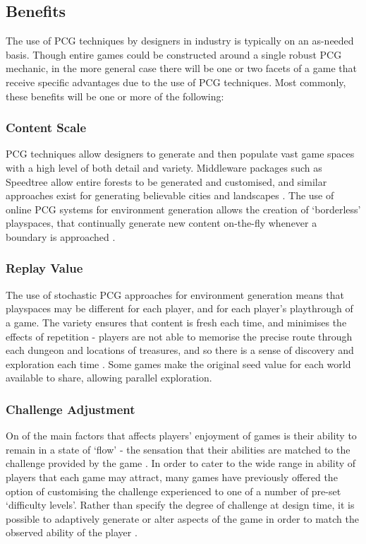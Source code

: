 \documentclass{acm_proc_article-sp}
\begin{document}
\newpage
\subsection{Benefits}
The use of PCG techniques by designers in industry is typically on an as-needed basis. Though entire games could be constructed around a single robust PCG mechanic, in the more general case there will be one or two facets of a game that receive specific advantages due to the use of PCG techniques. Most commonly, these benefits will be one or more of the following:


\subsubsection{Content Scale}
PCG techniques allow designers to generate and then populate vast game spaces with a high level of both detail and variety. Middleware packages such as Speedtree\cite{speedtree} allow entire forests to be generated and customised, and similar approaches exist for generating believable cities and landscapes \cite{carli2011survey}. The use of online PCG systems for environment generation allows the creation of `borderless' playspaces, that continually generate new content on-the-fly whenever a boundary is approached \cite{mario}.

\subsubsection{Replay Value}
The use of stochastic PCG approaches for environment generation means that playspaces may be different for each player, and for each player's playthrough of a game. The variety ensures that content is fresh each time, and minimises the effects of repetition - players are not able to memorise the precise route through each dungeon and locations of treasures, and so there is a sense of discovery and exploration each time \cite{hendrikx2012procedural}. Some games make the original seed value for each world available to share, allowing parallel exploration.

\subsubsection{Challenge Adjustment}
\label{sec:DDA}
On of the main factors that affects players' enjoyment of games is their ability to remain in a state of `flow' - the sensation that their abilities are matched to the challenge provided by the game \cite{flow}.
In order to cater to the wide range in ability of players that each game may attract, many games have previously offered the option of customising the challenge experienced to one of a number of pre-set `difficulty levels'. 
Rather than specify the degree of challenge at design time, it is possible to adaptively generate or alter aspects of the game \cite{lopes2011adaptivity} in order to match the observed ability of the player \cite{ResE5}.
\end{document}
